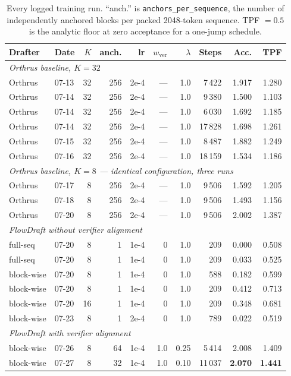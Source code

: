 \documentclass{zapiski}
\begin{document}
\begin{table}[!tbh]
\centering\small
\begin{tabular}{llrrrrrrrr}
\toprule
Drafter & Date & $K$ & anch. & lr & $w_{\mathrm{ver}}$ & $\lambda$ & Steps & Acc. & TPF \\
\midrule
\multicolumn{10}{l}{\emph{Orthrus baseline, $K=32$}}\\
Orthrus & 07-13 & 32 & 256 & 2e-4 & --- & 1.0 & 7\,422  & 1.917 & 1.280 \\
Orthrus & 07-14 & 32 & 256 & 2e-4 & --- & 1.0 & 9\,380  & 1.500 & 1.103 \\
Orthrus & 07-14 & 32 & 256 & 2e-4 & --- & 1.0 & 6\,030  & 1.692 & 1.185 \\
Orthrus & 07-14 & 32 & 256 & 2e-4 & --- & 1.0 & 17\,828 & 1.698 & 1.261 \\
Orthrus & 07-15 & 32 & 256 & 2e-4 & --- & 1.0 & 8\,487  & 1.882 & 1.249 \\
Orthrus & 07-16 & 32 & 256 & 2e-4 & --- & 1.0 & 18\,159 & 1.534 & 1.186 \\
\midrule
\multicolumn{10}{l}{\emph{Orthrus baseline, $K=8$ --- identical configuration, three runs}}\\
Orthrus & 07-17 & 8 & 256 & 2e-4 & --- & 1.0 & 9\,506 & 1.592 & 1.205 \\
Orthrus & 07-18 & 8 & 256 & 2e-4 & --- & 1.0 & 9\,506 & 1.493 & 1.156 \\
Orthrus & 07-20 & 8 & 256 & 2e-4 & --- & 1.0 & 9\,506 & 2.002 & 1.387 \\
\midrule
\multicolumn{10}{l}{\emph{FlowDraft without verifier alignment}}\\
full-seq    & 07-20 & 8  & 1 & 1e-4 & 0 & 1.0 & 209 & 0.000 & 0.508 \\
full-seq    & 07-20 & 8  & 1 & 1e-4 & 0 & 1.0 & 209 & 0.033 & 0.525 \\
block-wise  & 07-20 & 8  & 1 & 1e-4 & 0 & 1.0 & 588 & 0.182 & 0.599 \\
block-wise  & 07-20 & 8  & 1 & 1e-4 & 0 & 1.0 & 209 & 0.412 & 0.713 \\
block-wise  & 07-20 & 16 & 1 & 1e-4 & 0 & 1.0 & 209 & 0.348 & 0.681 \\
block-wise  & 07-23 & 8  & 1 & 2e-4 & 0 & 1.0 & 789 & 0.022 & 0.519 \\
\midrule
\multicolumn{10}{l}{\emph{FlowDraft with verifier alignment}}\\
block-wise & 07-26 & 8 & 64 & 1e-4 & 1.0 & 0.25 & 5\,414  & 2.008 & 1.409 \\
block-wise & 07-27 & 8 & 32 & 1e-4 & 1.0 & 0.10 & 11\,037 & \textbf{2.070} & \textbf{1.441} \\
\bottomrule
\end{tabular}
\caption{Every logged training run. ``anch.'' is
\texttt{anchors\_per\_sequence}, the number of independently anchored blocks
per packed 2048-token sequence. TPF $=0.5$ is the analytic floor at zero
acceptance for a one-jump schedule.}
\label{tab:allruns}
\end{table}
\end{document}
